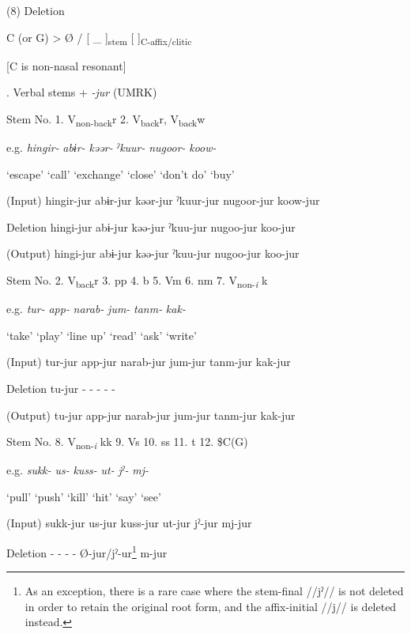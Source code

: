 (8)  Deletion

  C (or G)  >  Ø  /  [   \_ ]\textsubscript{stem}  [   ]\textsubscript{C-affix/clitic}

  [C is non-nasal resonant]    

\begin{styleBeschriftung}
\textmd{. Verbal stems +} \textmd{\textit{{}-jur}}\textmd{ (UMRK)}
\end{styleBeschriftung}

Stem No.  1. V\textsubscript{non-back}r  2. V\textsubscript{back}r, V\textsubscript{back}w

e.g.  \textit{hingir-}  \textit{abɨr-}  \textit{kəər-}  \textit{ˀkuur-}  \textit{nugoor-}  \textit{koow-}

  ‘escape’  ‘call’  ‘exchange’  ‘close’  ‘don’t do’  ‘buy’

(Input)  hingir-jur  abɨr-jur  kəər-jur  ˀkuur-jur  nugoor-jur  koow-jur

Deletion  hingi-jur  abɨ-jur  kəə-jur  ˀkuu-jur  nugoo-jur  koo-jur

(Output)  hingi-jur  abɨ-jur  kəə-jur  ˀkuu-jur  nugoo-jur  koo-jur

Stem No.  2. V\textsubscript{back}r  3. pp  4. b  5. Vm  6. nm  7. V\textsubscript{non-}\textit{\textsubscript{i} }k

e.g.  \textit{tur-}  \textit{app-}  \textit{narab-}  \textit{jum-}  \textit{tanm-}  \textit{kak-}

  ‘take’  ‘play’  ‘line up’  ‘read’  ‘ask’  ‘write’

(Input)  tur-jur  app-jur  narab-jur  jum-jur  tanm-jur  kak-jur

Deletion  tu-jur  {}-  {}-  {}-  {}-  {}-

(Output)  tu-jur  app-jur  narab-jur  jum-jur  tanm-jur  kak-jur

Stem No.  8. V\textsubscript{non-}\textit{\textsubscript{i} }kk  9. Vs  10. ss  11. t  12. \$C(G)

e.g.  \textit{sukk-}  \textit{us-}  \textit{kuss-}  \textit{ut-}  \textit{jˀ-}  \textit{mj-}

  ‘pull’  ‘push’  ‘kill’  ‘hit’  ‘say’  ‘see’

(Input)  sukk-jur  us-jur  kuss-jur  ut-jur  jˀ-jur  mj-jur

Deletion  {}-  {}-  {}-  {}-  Ø-jur/jˀ-ur\footnote{As an exception, there is a rare case where the stem-final //jˀ// is not deleted in order to retain the original root form, and the affix-initial //j// is deleted instead.}  m-jur

